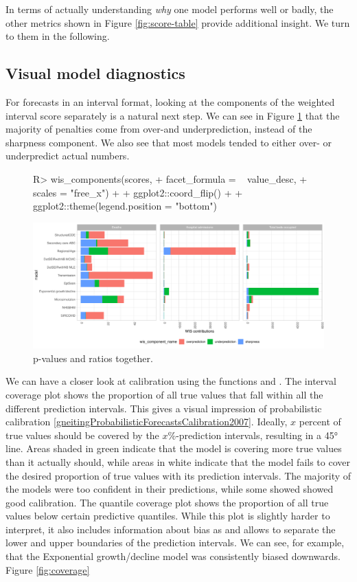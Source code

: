 \documentclass[article,shortnames]{jss}
\newcommand{\fct}[1]{\code{#1()}}
\begin{document}
In terms of actually understanding \textit{why} one model performs well or badly, the other metrics shown in Figure \ref{fig:score-table} provide additional insight. We turn to them in the following. 

\subsection{Visual model diagnostics}

For forecasts in an interval format, looking at the components of the weighted interval score separately is a natural next step. We can see in Figure \ref{fig:wis-components} that the majority of penalties come from over-and underprediction, instead of the sharpness component. We also see that most models tended to either over- or underpredict actual numbers.  

\begin{figure}[h!]
\centering
\begin{Schunk}
\begin{Sinput}
R> wis_components(scores, 
+                 facet_formula = ~ value_desc, 
+                 scales = "free_x") + 
+    ggplot2::coord_flip() + 
+    ggplot2::theme(legend.position = "bottom")
\end{Sinput}
\end{Schunk}
\includegraphics{plots/plot-WIS-components}
\caption{\label{fig:wis-components} p-values and ratios together.}
\end{figure}

We can have a closer look at calibration using the functions \fct{interval\_coverage} and \fct{quantile\_coverage}. The interval coverage plot shows the proportion of all true values that fall within all the different prediction intervals. This gives a visual impression of probabilistic calibration \ref{gneitingProbabilisticForecastsCalibration2007}. Ideally, $x$ percent of true values should be covered by the $x$\%-prediction intervals, resulting in a 45° line. Areas shaded in green indicate that the model is covering more true values than it actually should, while areas in white indicate that the model fails to cover the desired proportion of true values with its prediction intervals. The majority of the models were too confident in their predictions, while some showed showed good calibration. The quantile coverage plot shows the proportion of all true values below certain predictive quantiles. While this plot is slightly harder to interpret, it also includes information about bias as and allows to separate the lower and upper boundaries of the prediction intervals. We can see, for example, that the Exponential growth/decline model was consistently biased downwards. Figure \ref{fig:coverage}
\end{document}
